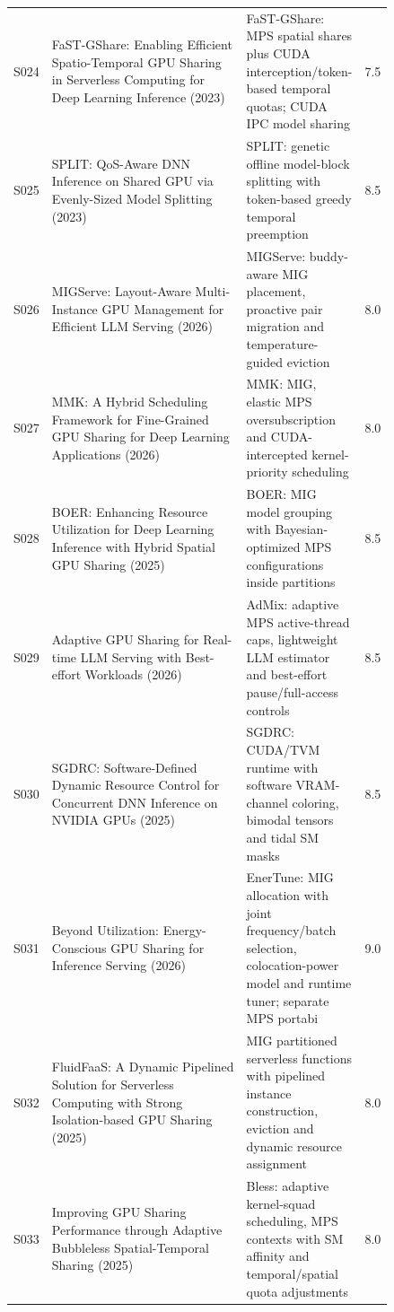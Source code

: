 \begin{longtable}{P{0.105\linewidth}P{0.52\linewidth}P{0.22\linewidth}r}
S024 & FaST-GShare: Enabling Efficient Spatio-Temporal GPU Sharing in Serverless Computing for Deep Learning Inference (2023) \cite{fastgshare} & FaST-GShare: MPS spatial shares plus CUDA interception/token-based temporal quotas; CUDA IPC model sharing & 7.5 \\
S025 & SPLIT: QoS-Aware DNN Inference on Shared GPU via Evenly-Sized Model Splitting (2023) \cite{split} & SPLIT: genetic offline model-block splitting with token-based greedy temporal preemption & 8.5 \\
S026 & MIGServe: Layout-Aware Multi-Instance GPU Management for Efficient LLM Serving (2026) \cite{migserve} & MIGServe: buddy-aware MIG placement, proactive pair migration and temperature-guided eviction & 8.0 \\
S027 & MMK: A Hybrid Scheduling Framework for Fine-Grained GPU Sharing for Deep Learning Applications (2026) \cite{mmk} & MMK: MIG, elastic MPS oversubscription and CUDA-intercepted kernel-priority scheduling & 8.0 \\
S028 & BOER: Enhancing Resource Utilization for Deep Learning Inference with Hybrid Spatial GPU Sharing (2025) \cite{boer} & BOER: MIG model grouping with Bayesian-optimized MPS configurations inside partitions & 8.5 \\
S029 & Adaptive GPU Sharing for Real-time LLM Serving with Best-effort Workloads (2026) \cite{admix} & AdMix: adaptive MPS active-thread caps, lightweight LLM estimator and best-effort pause/full-access controls & 8.5 \\
S030 & SGDRC: Software-Defined Dynamic Resource Control for Concurrent DNN Inference on NVIDIA GPUs (2025) \cite{sgdrc} & SGDRC: CUDA/TVM runtime with software VRAM-channel coloring, bimodal tensors and tidal SM masks & 8.5 \\
S031 & Beyond Utilization: Energy-Conscious GPU Sharing for Inference Serving (2026) \cite{enertune} & EnerTune: MIG allocation with joint frequency/batch selection, colocation-power model and runtime tuner; separate MPS portabi & 9.0 \\
S032 & FluidFaaS: A Dynamic Pipelined Solution for Serverless Computing with Strong Isolation-based GPU Sharing (2025) \cite{fluidfaas} & MIG partitioned serverless functions with pipelined instance construction, eviction and dynamic resource assignment & 8.0 \\
S033 & Improving GPU Sharing Performance through Adaptive Bubbleless Spatial-Temporal Sharing (2025) \cite{bless} & Bless: adaptive kernel-squad scheduling, MPS contexts with SM affinity and temporal/spatial quota adjustments & 8.0 \\

\end{longtable}
